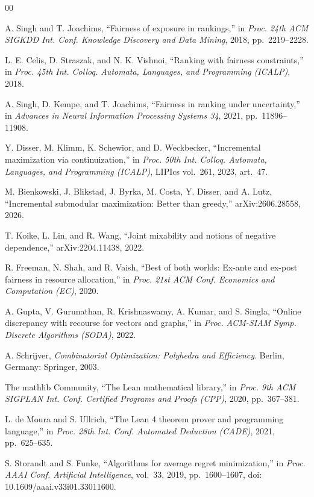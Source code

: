 \documentclass[conference]{IEEEtran}
\theoremstyle{definition}
\begin{document}
\begin{thebibliography}{00}

 A. Singh and T. Joachims, ``Fairness of exposure in rankings,'' in
\emph{Proc. 24th ACM SIGKDD Int. Conf. Knowledge Discovery and Data Mining}, 2018,
pp.~2219--2228.

 L. E. Celis, D. Straszak, and N. K. Vishnoi, ``Ranking with fairness
constraints,'' in \emph{Proc. 45th Int. Colloq. Automata, Languages, and Programming
(ICALP)}, 2018.

 A. Singh, D. Kempe, and T. Joachims, ``Fairness in ranking under
uncertainty,'' in \emph{Advances in Neural Information Processing Systems 34}, 2021,
pp.~11896--11908.

 Y. Disser, M. Klimm, K. Schewior, and D. Weckbecker, ``Incremental
maximization via continuization,'' in \emph{Proc. 50th Int. Colloq. Automata, Languages, and
Programming (ICALP)}, LIPIcs vol.~261, 2023, art.~47.

 M. Bienkowski, J. Blikstad, J. Byrka, M. Costa, Y. Disser, and
A. Lutz, ``Incremental submodular maximization: Better than greedy,'' arXiv:2606.28558, 2026.

 T. Koike, L. Lin, and R. Wang, ``Joint mixability and notions of negative
dependence,'' arXiv:2204.11438, 2022.

 R. Freeman, N. Shah, and R. Vaish, ``Best of both worlds: Ex-ante and
ex-post fairness in resource allocation,'' in \emph{Proc. 21st ACM Conf. Economics and
Computation (EC)}, 2020.

 A. Gupta, V. Gurunathan, R. Krishnaswamy, A. Kumar, and S. Singla,
``Online discrepancy with recourse for vectors and graphs,'' in \emph{Proc. ACM-SIAM Symp.
Discrete Algorithms (SODA)}, 2022.

 A. Schrijver, \emph{Combinatorial Optimization: Polyhedra and
Efficiency}. Berlin, Germany: Springer, 2003.

 The mathlib Community, ``The Lean mathematical library,'' in
\emph{Proc. 9th ACM SIGPLAN Int. Conf. Certified Programs and Proofs (CPP)}, 2020,
pp.~367--381.

 L. de Moura and S. Ullrich, ``The Lean 4 theorem prover and
programming language,'' in \emph{Proc. 28th Int. Conf. Automated Deduction (CADE)}, 2021,
pp.~625--635.


 S. Storandt and S. Funke, ``Algorithms for average regret minimization,''
in \emph{Proc. AAAI Conf. Artificial Intelligence}, vol.~33, 2019, pp.~1600--1607,
doi: 10.1609/aaai.v33i01.33011600.


\end{thebibliography}
\end{document}
